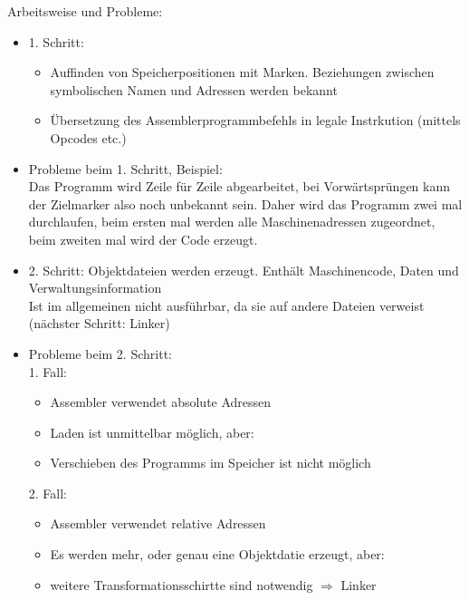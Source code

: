		\noindent Arbeitsweise und Probleme:
		\begin{itemize}
			\item 1. Schritt:
					\begin{itemize}
						\item Auffinden von Speicherpositionen mit Marken. Beziehungen zwischen
							symbolischen Namen und Adressen werden bekannt
						\item Übersetzung des Assemblerprogrammbefehls in legale Instrkution
							(mittels Opcodes etc.)
					\end{itemize}
			\item Probleme beim 1. Schritt, Beispiel: \\
					Das Programm wird Zeile für Zeile abgearbeitet, bei Vorwärtsprüngen kann der Zielmarker
					also noch unbekannt sein. Daher wird das Programm zwei mal durchlaufen, beim ersten mal 
					werden alle Maschinenadressen zugeordnet, beim zweiten mal wird der Code erzeugt.
			\item 2. Schritt: Objektdateien werden erzeugt. Enthält Maschinencode, Daten und Verwaltungsinformation \\
					Ist im allgemeinen nicht ausführbar, da sie auf andere Dateien verweist (nächster Schritt: Linker)
			\item Probleme beim 2. Schritt: \\
				1. Fall:
					\begin{itemize}
						\item Assembler verwendet absolute Adressen
						\item Laden ist unmittelbar möglich, aber:
						\item Verschieben des Programms im Speicher ist nicht möglich
					\end{itemize}
				2. Fall:
					\begin{itemize}
						\item Assembler verwendet relative Adressen
						\item Es werden mehr, oder genau eine Objektdatie erzeugt, aber:
						\item weitere Transformationsschirtte sind notwendig $\Rightarrow$ Linker
					\end{itemize}
		\end{itemize}

		

